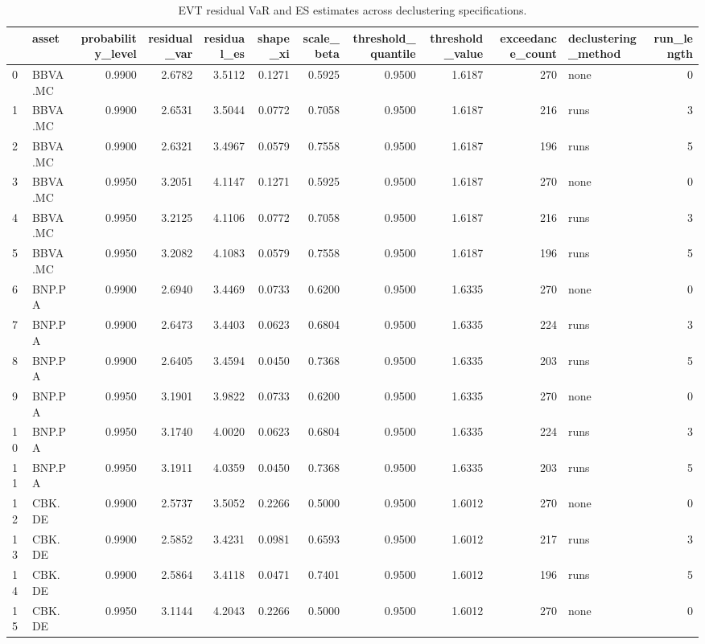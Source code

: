 \begin{table}
\caption{EVT residual VaR and ES estimates across declustering specifications.}
\label{tab:evt_var_es_declustering_robustness}
\begin{tabular}{llrrrrrrrrlr}
\toprule
 & asset & probability_level & residual_var & residual_es & shape_xi & scale_beta & threshold_quantile & threshold_value & exceedance_count & declustering_method & run_length \\
\midrule
0 & BBVA.MC & 0.9900 & 2.6782 & 3.5112 & 0.1271 & 0.5925 & 0.9500 & 1.6187 & 270 & none & 0 \\
1 & BBVA.MC & 0.9900 & 2.6531 & 3.5044 & 0.0772 & 0.7058 & 0.9500 & 1.6187 & 216 & runs & 3 \\
2 & BBVA.MC & 0.9900 & 2.6321 & 3.4967 & 0.0579 & 0.7558 & 0.9500 & 1.6187 & 196 & runs & 5 \\
3 & BBVA.MC & 0.9950 & 3.2051 & 4.1147 & 0.1271 & 0.5925 & 0.9500 & 1.6187 & 270 & none & 0 \\
4 & BBVA.MC & 0.9950 & 3.2125 & 4.1106 & 0.0772 & 0.7058 & 0.9500 & 1.6187 & 216 & runs & 3 \\
5 & BBVA.MC & 0.9950 & 3.2082 & 4.1083 & 0.0579 & 0.7558 & 0.9500 & 1.6187 & 196 & runs & 5 \\
6 & BNP.PA & 0.9900 & 2.6940 & 3.4469 & 0.0733 & 0.6200 & 0.9500 & 1.6335 & 270 & none & 0 \\
7 & BNP.PA & 0.9900 & 2.6473 & 3.4403 & 0.0623 & 0.6804 & 0.9500 & 1.6335 & 224 & runs & 3 \\
8 & BNP.PA & 0.9900 & 2.6405 & 3.4594 & 0.0450 & 0.7368 & 0.9500 & 1.6335 & 203 & runs & 5 \\
9 & BNP.PA & 0.9950 & 3.1901 & 3.9822 & 0.0733 & 0.6200 & 0.9500 & 1.6335 & 270 & none & 0 \\
10 & BNP.PA & 0.9950 & 3.1740 & 4.0020 & 0.0623 & 0.6804 & 0.9500 & 1.6335 & 224 & runs & 3 \\
11 & BNP.PA & 0.9950 & 3.1911 & 4.0359 & 0.0450 & 0.7368 & 0.9500 & 1.6335 & 203 & runs & 5 \\
12 & CBK.DE & 0.9900 & 2.5737 & 3.5052 & 0.2266 & 0.5000 & 0.9500 & 1.6012 & 270 & none & 0 \\
13 & CBK.DE & 0.9900 & 2.5852 & 3.4231 & 0.0981 & 0.6593 & 0.9500 & 1.6012 & 217 & runs & 3 \\
14 & CBK.DE & 0.9900 & 2.5864 & 3.4118 & 0.0471 & 0.7401 & 0.9500 & 1.6012 & 196 & runs & 5 \\
15 & CBK.DE & 0.9950 & 3.1144 & 4.2043 & 0.2266 & 0.5000 & 0.9500 & 1.6012 & 270 & none & 0 \\

\end{tabular}
\end{table}
